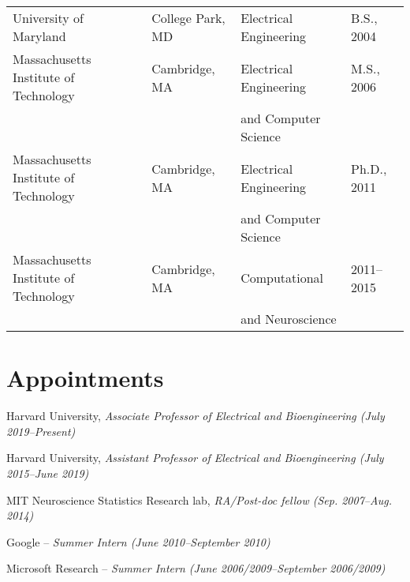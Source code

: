 \documentclass[12pt]{article}
\renewenvironment{itemize}{
  \begin{list}{}{
    \setlength{\itemsep}{0.25em}
    \setlength{\parskip}{0pt}
    \setlength{\parsep}{0.25em}
  }
}{
  \end{list}
}
\begin{document}
\begin{tabular}{llll}
University of Maryland & College Park, MD & Electrical Engineering & B.S., 2004 \\
Massachusetts Institute of Technology & Cambridge, MA & Electrical Engineering & M.S., 2006 \\
 &  & and Computer Science & \\
Massachusetts Institute of Technology & Cambridge, MA & Electrical Engineering & Ph.D., 2011 \\
 &  & and Computer Science & \\
Massachusetts Institute of Technology & Cambridge, MA & Computational & 2011--2015 \\
 &  & and Neuroscience & \\

\end{tabular}


\section*{Appointments}

\begin{itemize}
   \item Harvard University, \emph{Associate Professor of Electrical and Bioengineering (July 2019--Present)}
   
    \item Harvard University, \emph{Assistant Professor of Electrical and Bioengineering (July 2015--June 2019)}

    \item MIT Neuroscience Statistics Research lab, \emph{RA/Post-doc fellow (Sep. 2007--Aug. 2014)}

    \item Google -- \emph{Summer Intern (June 2010--September 2010)}

    \item Microsoft Research -- \emph{Summer Intern (June 2006/2009--September 2006/2009)}
\end{itemize}
\end{document}
